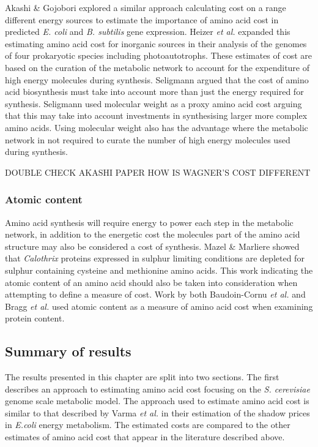 Akashi \& Gojobori \cite{akashi2002} explored a similar approach calculating cost on a range different energy sources to estimate the importance of amino acid cost in predicted \emph{E. coli} and \emph{B. subtilis} gene expression. Heizer \emph{et al.} \cite{heizer} expanded this estimating amino acid cost for inorganic sources in their analysis of the genomes of four prokaryotic species including photoautotrophs. These estimates of cost are based on the curation of the metabolic network to account for the expenditure of high energy molecules during synthesis. Seligmann argued \cite{seligmann2004} that the cost of amino acid biosynthesis must take into account more than just the energy required for synthesis. Seligmann used molecular weight as a proxy amino acid cost arguing that this may take into account investments in synthesising larger more complex amino acids. Using molecular weight also has the advantage where the metabolic network in not required to curate the number of high energy molecules used during synthesis.

DOUBLE CHECK AKASHI PAPER
HOW IS WAGNER'S COST DIFFERENT

\subsubsection{Atomic content}

Amino acid synthesis will require energy to power each step in the metabolic network, in addition to the energetic cost the molecules part of the amino acid structure may also be considered a cost of synthesis. Mazel \& Marliere \cite{mazel1989} showed that \emph{Calothrix} proteins expressed in sulphur limiting conditions are depleted for sulphur containing cysteine and methionine amino acids. This work indicating the atomic content of an amino acid should also be taken into consideration when attempting to define a measure of cost. Work by both Baudoin-Cornu \emph{et al.} \cite{baudoin2001} and Bragg \emph{et al.}	\cite{bragg2006} used atomic content as a measure of amino acid cost when examining protein content.

\subsection{Summary of results}

The results presented in this chapter are split into two sections. The first describes an approach to estimating amino acid cost focusing on the \emph{S. cerevisiae} genome scale metabolic model. The approach used to estimate amino acid cost is similar to that described by Varma \emph{et al.} in their estimation of the shadow prices in \emph{E.coli} energy metabolism. The estimated costs are compared to the other estimates of amino acid cost that appear in the literature described above.


